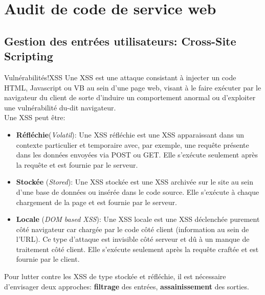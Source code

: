 \section{Audit de code de service web}
\subsection{Gestion des entrées utilisateurs: Cross-Site Scripting}
\begin{Define}{Vulnérabilités!XSS}
Une \gls{XSS} est une attaque consistant à injecter un code HTML, Javascript ou VB au sein d'une page web, visant à le faire exécuter par le navigateur du client de sorte d'induire un comportement anormal ou d'exploiter une vulnérabilité du-dit navigateur.\\Une XSS peut être:\begin{itemize}
\item \textbf{Réfléchie}(\textit{Volatil}): Une XSS réfléchie est une XSS apparaissant dans un contexte particulier et temporaire avec, par exemple, une requête présente dans les données envoyées via POST ou GET. Elle s'exécute seulement après la requête et est fournie par le serveur.
\item \textbf{Stockée} (\textit{Stored}): Une XSS stockée est une XSS archivée sur le site au sein d'une base de données ou insérée dans le code source. Elle s'exécute à chaque chargement de la page et est fournie par le serveur.
\item \textbf{Locale} (\textit{DOM based XSS}): Une XSS locale est une XSS déclenchée purement côté navigateur car chargée par le code côté client (information au sein de l'URL). Ce type d'attaque est invisible côté serveur et dû à un manque de traitement côté client. Elle s'exécute seulement après la requête craftée et est fournie par le client.
\end{itemize}
\end{Define}

Pour lutter contre les XSS de type stockée et réfléchie, il est nécessaire d'envisager deux approches: \textbf{filtrage} des entrées, \textbf{assainissement} des sorties.

